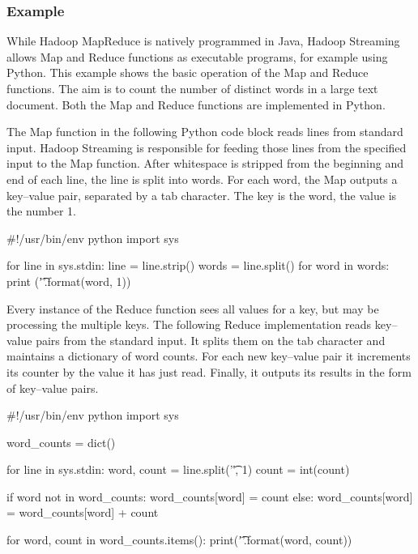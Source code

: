 \begin{withcode}
\subsubsection*{Example}

While Hadoop MapReduce is natively programmed in Java, Hadoop Streaming allows Map and Reduce functions as executable programs, for example using Python. This example shows the basic operation of the Map and Reduce functions. The aim is to count the number of distinct words in a large text document. Both the Map and Reduce functions are implemented in Python. 

The Map function in the following Python code block reads lines from standard input. Hadoop Streaming is responsible for feeding those lines from the specified input to the Map function. After whitespace is stripped from the beginning and end of each line, the line is split into words. For each word, the Map outputs a key--value pair, separated by a tab character. The key is the word, the value is the number 1.

\begin{pythoncode}
#!/usr/bin/env python
import sys

for line in sys.stdin:
    line = line.strip()
    words = line.split()
    for word in words:
        print ('{}\t{}'.format(word, 1))
\end{pythoncode}

Every instance of the Reduce function sees all values for a key, but may be processing the multiple keys. The following Reduce implementation reads key--value pairs from the standard input. It splits them on the tab character and maintains a dictionary of word counts. For each new key--value pair it increments its counter by the value it has just read. Finally, it outputs its results in the form of key--value pairs.

\begin{pythoncode}
#!/usr/bin/env python
import sys

word_counts = dict()

for line in sys.stdin:
    word, count = line.split('\t', 1)
    count = int(count)

    if word not in word_counts:
       word_counts[word] = count
    else:
      word_counts[word] = word_counts[word] + count

for word, count in word_counts.items():
    print('{}\t{}'.format(word, count))
\end{pythoncode}


\end{withcode}
